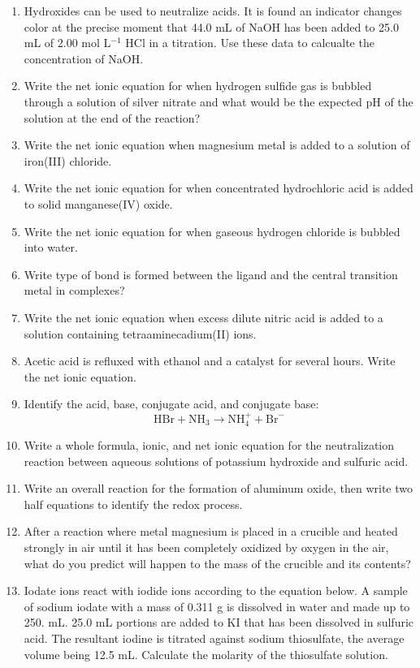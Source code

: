 \documentclass[../chem.tex]{subfiles}
\begin{document}
\begin{enumerate}
    \item Hydroxides can be used to neutralize acids. It is found an indicator changes color at the precise moment that 44.0 mL of NaOH has been added to 25.0 mL of 2.00 mol L$^{-1}$ HCl in a titration. Use these data to calcualte the concentration of NaOH.
    \item Write the net ionic equation for when hydrogen sulfide gas is bubbled through a solution of silver nitrate and what would be the expected pH of the solution at the end of the reaction?
    \item Write the net ionic equation when magnesium metal is added to a solution of iron(III) chloride.
    \item Write the net ionic equation for when concentrated hydrochloric acid is added to solid manganese(IV) oxide.
    \item Write the net ionic equation for when gaseous hydrogen chloride is bubbled into water.
    \item Write type of bond is formed between the ligand and the central transition metal in complexes?
    \item Write the net ionic equation when excess dilute nitric acid is added to a solution containing tetraaminecadium(II) ions.
    \item Acetic acid is refluxed with ethanol and a catalyst for several hours. Write the net ionic equation.
    \item Identify the acid, base, conjugate acid, and conjugate base:
    \[\text{HBr}+\text{NH}_3\rightarrow \text{NH}_4^+ +\text{Br}^-\]
    \item Write a whole formula, ionic, and net ionic equation for the neutralization reaction between aqueous solutions of potassium hydroxide and sulfuric acid.
    \item Write an overall reaction for the formation of aluminum oxide, then write two half equations to identify the redox process.
    \item After a reaction where metal magnesium is placed in a crucible and heated strongly in air until it has been completely oxidized by oxygen in the air, what do you predict will happen to the mass of the crucible and its contents?
    \item Iodate ions react with iodide ions according to the equation below. A sample of sodium iodate with a mass of 0.311 g is dissolved in water and made up to 250. mL. 25.0 mL portions are added to KI that has been dissolved in sulfuric acid. The resultant iodine is titrated against sodium thiosulfate, the average volume being 12.5 mL. Calculate the molarity of the thiosulfate solution.

\end{enumerate}
\end{document}
